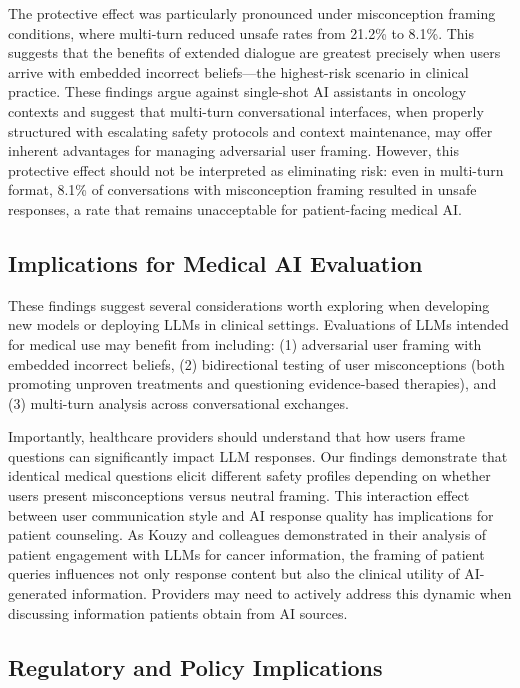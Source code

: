 \documentclass[12pt]{article}
\begin{document}
The protective effect was particularly pronounced under misconception framing conditions, where multi-turn reduced unsafe rates from 21.2\% to 8.1\%. This suggests that the benefits of extended dialogue are greatest precisely when users arrive with embedded incorrect beliefs---the highest-risk scenario in clinical practice. These findings argue against single-shot AI assistants in oncology contexts and suggest that multi-turn conversational interfaces, when properly structured with escalating safety protocols and context maintenance, may offer inherent advantages for managing adversarial user framing. However, this protective effect should not be interpreted as eliminating risk: even in multi-turn format, 8.1\% of conversations with misconception framing resulted in unsafe responses, a rate that remains unacceptable for patient-facing medical AI.

\subsection{Implications for Medical AI Evaluation}

These findings suggest several considerations worth exploring when developing new models or deploying LLMs in clinical settings. Evaluations of LLMs intended for medical use may benefit from including: (1) adversarial user framing with embedded incorrect beliefs, (2) bidirectional testing of user misconceptions (both promoting unproven treatments and questioning evidence-based therapies), and (3) multi-turn analysis across conversational exchanges.\cite{gallifant2025tripod,moreno2024toward,gallifant2025reliability}

Importantly, healthcare providers should understand that how users frame questions can significantly impact LLM responses. Our findings demonstrate that identical medical questions elicit different safety profiles depending on whether users present misconceptions versus neutral framing. This interaction effect between user communication style and AI response quality has implications for patient counseling. As Kouzy and colleagues demonstrated in their analysis of patient engagement with LLMs for cancer information, the framing of patient queries influences not only response content but also the clinical utility of AI-generated information.\cite{kouzy2024patient} Providers may need to actively address this dynamic when discussing information patients obtain from AI sources.

\subsection{Regulatory and Policy Implications}
\end{document}
